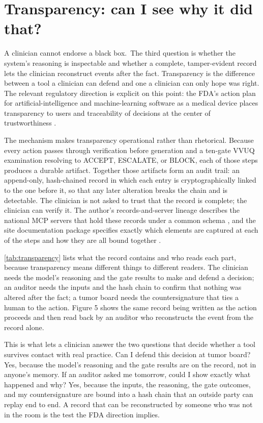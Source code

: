\section{Transparency: can I see why it did that?}
\label{sec:transparency}

A clinician cannot endorse a black box.\ The third question is whether the system's
reasoning is inspectable and whether a complete, tamper-evident record lets the
clinician reconstruct events after the fact. Transparency is the difference between
a tool a clinician can defend and one a clinician can only hope was right. The
relevant regulatory direction is explicit on this point: the FDA's action plan for
artificial-intelligence and machine-learning software as a medical device places
transparency to users and traceability of decisions at the center of trustworthiness \cite{fda2021samd}.

The mechanism makes transparency operational rather than rhetorical. Because every
action passes through verification before generation and a ten-gate VVUQ
examination resolving to ACCEPT, ESCALATE, or BLOCK, each of those steps produces a
durable artifact. Together those artifacts form an audit trail: an append-only,
hash-chained record in which each entry is cryptographically linked to the one
before it, so that any later alteration breaks the chain and is detectable. The
clinician is not asked to trust that the record is complete; the clinician can
verify it. The author's records-and-server lineage describes the national MCP
servers that hold these records under a common schema
\cite{Kawchak2026NationalMCPServersPhysical}, and the site documentation package
specifies exactly which elements are captured at each of the steps and how they are all bound
together \cite{Kawchak2026PhysicalAIOncologyClinical}.

\autoref{tab:transparency} lists what the record contains and who reads each part,
because transparency means different things to different readers. The clinician
needs the model's reasoning and the gate results to make and defend a decision; an
auditor needs the inputs and the hash chain to confirm that nothing was altered
after the fact; a tumor board needs the countersignature that ties a human to the
action. Figure 5 shows the same record being written as the action proceeds and
then read back by an auditor who reconstructs the event from the record alone.

This is what lets a clinician answer the two questions that decide whether a tool
survives contact with real practice. Can I defend this decision at tumor board?
Yes, because the model's reasoning and the gate results are on the record, not in
anyone's memory. If an auditor asked me tomorrow, could I show exactly what happened
and why? Yes, because the inputs, the reasoning, the gate outcomes, and my
countersignature are bound into a hash chain that an outside party can replay
end to end. A record that can be reconstructed by someone who was not in the room is
the test the FDA direction implies.

